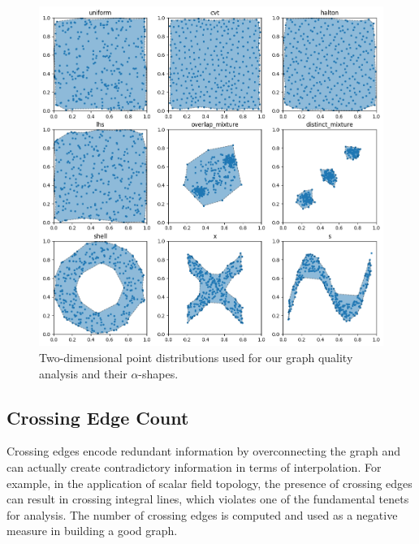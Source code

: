 \begin{figure}[htbp]
    \includegraphics[width=\linewidth]{figs/chap7/sample_shapes.png}
    \caption[$\alpha$-shapes of the two-dimensional distributions used for graph quality study]{Two-dimensional point distributions used for our graph quality analysis and their $\alpha$-shapes.}
    \label{fig:shapes}
\end{figure}

\subsection{Crossing Edge Count}
%
Crossing edges encode redundant information by overconnecting the graph and can actually create contradictory information in terms of interpolation.
%
For example, in the application of scalar field topology, the presence of crossing edges can result in crossing integral lines, which violates one of the fundamental tenets for analysis.
%
The number of crossing edges is computed and used as a negative measure in building a good graph.

